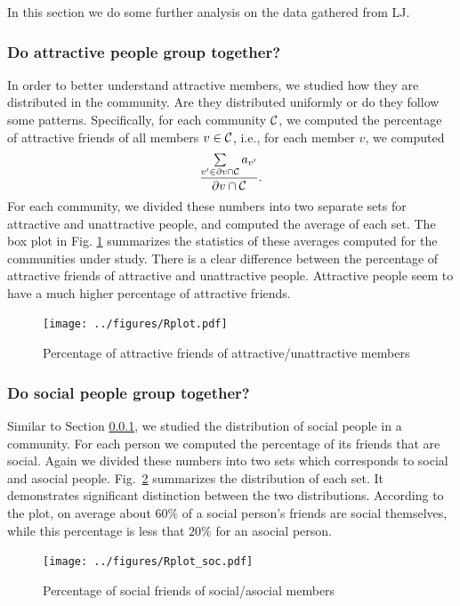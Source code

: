 
In this section we do some further analysis on the data gathered from LJ. 

\subsubsection{Do attractive people group together?}\label{sec:att_dist}

In order to better understand attractive members, we studied how they are distributed in the community. Are they distributed uniformly or do they follow some patterns.  Specifically,  for each community $\mathcal{C}$, we computed the percentage of attractive friends of all members $v\in\mathcal{C}$, i.e., for each member $v$, we computed
\[
\frac{\sum\limits_{v'\in\partial v \cap \mathcal{C} } a_{v'}}{\partial v \cap \mathcal{C} }.
\]  
For each community, we divided these numbers into two separate sets for attractive and unattractive people, and computed the average of each set. The box plot in Fig. \ref{fig: perc att} summarizes the statistics of these averages computed for the communities under study. There is a clear difference between the percentage of attractive friends of attractive and unattractive people. Attractive people seem to have a much higher percentage of attractive friends. 
\begin{figure}
\begin{center}
\texttt{[image: ../figures/Rplot.pdf]}\caption{Percentage of attractive friends of attractive/unattractive members}\label{fig: perc att}
\end{center}
\end{figure}

\subsubsection{Do social people group together?}

Similar to Section \ref{sec:att_dist}, we studied the distribution of social people in a community. For each person we computed the percentage of its friends that are social. Again we divided these numbers into two sets which corresponds to social and asocial people. Fig.~\ref{fig: perc social} summarizes the distribution of each set. It demonstrates significant distinction between the two distributions.  According to the plot, on average about $60\%$ of a social person's friends are social themselves, while this percentage is less that $20\%$ for an asocial person.
\begin{figure}
\begin{center}
\texttt{[image: ../figures/Rplot\_soc.pdf]}\caption{Percentage of social friends of social/asocial members}\label{fig: perc social}
\end{center}
\end{figure}


